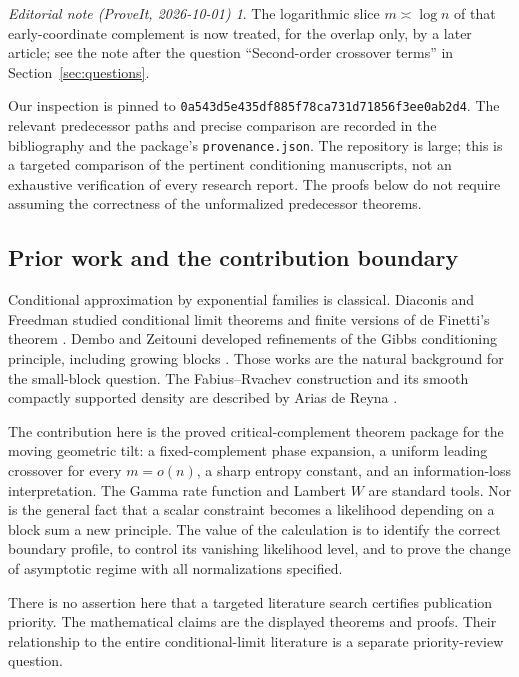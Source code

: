 \documentclass[11pt,a4paper]{article}
\numberwithin{equation}{section}
\theoremstyle{definition}
\theoremstyle{remark}
\newtheorem*{ednotelater}{Editorial note (ProveIt, 2026-10-01)}
\newcommand{\snap}{\texttt{0a543d5e435df885f78ca731d71856f3ee0ab2d4}}
\begin{document}
\begin{ednotelater}
The logarithmic slice $m\asymp\log n$ of that early-coordinate complement
is now treated, for the overlap only, by a later article; see the note
after the question ``Second-order crossover terms'' in
Section~\ref{sec:questions}.
\end{ednotelater}

Our inspection is pinned to \snap. The relevant predecessor paths and
precise comparison are recorded in the bibliography and the package's
\texttt{provenance.json}. The repository is large; this is a targeted
comparison of the pertinent conditioning manuscripts, not an exhaustive
verification of every research report. The proofs below do not require
assuming the correctness of the unformalized predecessor theorems.

\subsection{Prior work and the contribution boundary}
Conditional approximation by exponential families is classical.
Diaconis and Freedman studied conditional limit theorems and finite
versions of de Finetti's theorem \cite{df}. Dembo and Zeitouni developed
refinements of the Gibbs conditioning principle, including growing blocks
\cite{dz}. Those works are the natural background for the small-block
question. The Fabius--Rvachev construction and its smooth compactly
supported density are described by Arias de Reyna \cite{arias}.

The contribution here is the proved critical-complement theorem package
for the moving geometric tilt: a fixed-complement phase expansion, a
uniform leading crossover for every $m=o(n)$, a sharp entropy constant,
and an information-loss interpretation. The Gamma rate function and
Lambert $W$ are standard tools. Nor is the general fact that a scalar
constraint becomes a likelihood depending on a block sum a new principle.
The value of the calculation is to identify the correct boundary profile,
to control its vanishing likelihood level, and to prove the change of
asymptotic regime with all normalizations specified.

There is no assertion here that a targeted literature search certifies
publication priority. The mathematical claims are the displayed theorems
and proofs. Their relationship to the entire conditional-limit literature
is a separate priority-review question.
\end{document}
